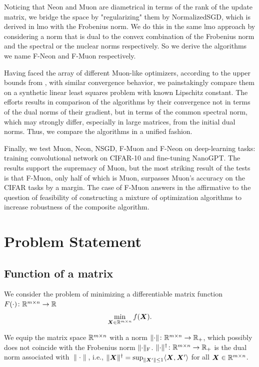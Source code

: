 \documentclass{article} %
\newcommand{\norm}[1]{\lVert #1\rVert}
\newcommand{\Rmn}{\R^{m\times n}}
\DeclarePairedDelimiter{\normf}{\|}{\|_\mathrm{F}}
\def\<#1,#2>{\langle #1,#2\rangle}
\begin{document}
 Noticing that Neon and Muon are diametrical in terms of the rank of the update matrix, we bridge the space by "regularizing" them by NormalizedSGD, which is derived in lmo with the Frobenius norm. We do this in the same lmo approach by considering a norm that is dual to the convex combination of the Frobenius norm and the spectral or the nuclear norms respectively. So we derive the algorithms we name F-Neon and F-Muon respectively.


 Having faced the array of different Muon-like optimizers, according to the upper bounds from \cite{kovalev2025understanding,riabinin2025gluon}, with similar convergence behavior, we painstakingly compare them on a synthetic linear least squares problem with known Lipschitz constant. The efforts results in comparison of the algorithms by their convergence not in terms of the dual norms of their gradient, but in terms of the common spectral norm, which may strongly differ, especially in large matrices, from the initial dual norms. Thus, we compare the algorithms in a unified fashion.

 Finally, we test Muon, Neon, NSGD, F-Muon and F-Neon on deep-learning tasks: training convolutional network on CIFAR-10 and fine-tuning NanoGPT. The results support the supremacy of Muon, but the most striking result of the tests is that F-Muon, only half of which is Muon, surpasses Muon's accuracy on the CIFAR tasks by a margin. The case of F-Muon answers in the affirmative to the question of feasibility of constructing a mixture of optimization algorithms to increase robustness of the composite algorithm.


\section{Problem Statement}
\subsection{Function of a matrix}
    We consider the problem of minimizing a differentiable matrix function $F(\cdot)\colon \Rmn \to \R$
    \begin{equation}\label{eq:mat}
        \min_{\mX \in \Rmn} f(\mX).
    \end{equation}

    We equip the matrix space $\Rmn$ with a norm $\norm{\cdot}\colon \Rmn \to \R_+$, which possibly does not coincide with the Frobenius norm $\normf{\cdot}$. $\norm{\cdot}^\dagger\colon \Rmn \to \R_+$ is the dual norm associated with $\norm{\cdot}$, i.e., $\norm{\mX}^\dagger = \sup_{\norm{\mX'}\leq 1} \<\mX,\mX'>$ for all $\mX \in \Rmn$.
 
\end{document}
